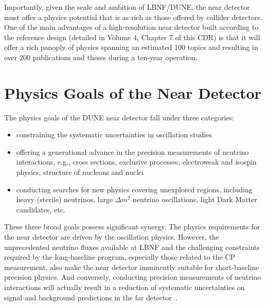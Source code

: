 


Importantly, given the scale and ambition of LBNF/DUNE, the near
detector must offer a physics potential that is as rich as those
offered by collider detectors.  One of the main advantages of a
high-resolution near detector built according to the reference design
(detailed in Volume 4, Chapter 7 of this CDR) is that it will offer a
rich panoply of physics %
spanning an estimated 100 topics and resulting in over 200
publications and theses during a ten-year operation.


\section{Physics Goals of the Near Detector}
\label{sec:physics-nd-goals}

The physics goals of the DUNE near detector fall under three categories: 

\begin{itemize}
\item constraining the systematic uncertainties in  oscillation studies
\item  offering a generational advance in the precision measurements of neutrino interactions, e.g., %
cross sections, exclusive processes, electroweak and isospin physics, structure of nucleons and nuclei %
\item conducting searches for new physics covering unexplored regions, 
including heavy (sterile) neutrinos, large $\Delta m^2$ neutrino oscillations, light Dark Matter 
candidates, etc. 
\end{itemize}

These three broad goals possess significant synergy. The physics
requirements for the near detector are driven by the oscillation
physics. However, the unprecedented neutrino fluxes available at LBNF
and the challenging constraints required by the long-baseline program,
especially those related to the CP measurement, also make the near
detector imminently suitable for short-baseline precision physics. And
conversely, conducting precision measurements of neutrino interactions
will actually %
result in a reduction of systematic uncertainties on signal and
background predictions in the far detector~\cite{HIRESMNU, DPR,
  Adams:2013qkq}.



